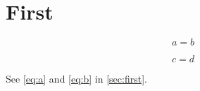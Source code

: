\documentclass{article}
\numberwithin{equation}{section}
\begin{document}
\section{First}\label{sec:first}

\begin{equation}\label{eq:a}a=b\end{equation}

\begin{equation}\label{eq:b}c=d\end{equation}

See \autoref{eq:a} and \autoref{eq:b} in \autoref{sec:first}.
\end{document}
